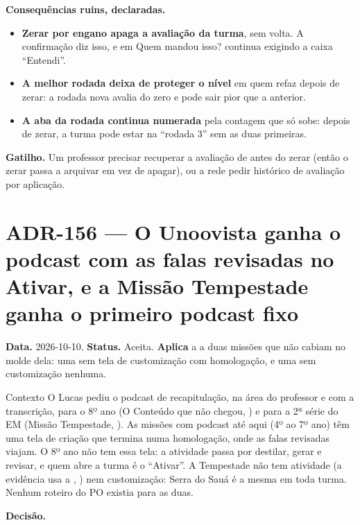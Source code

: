 \textbf{Consequências ruins, declaradas.}

\begin{itemize}
  \item \textbf{Zerar por engano apaga a avaliação da turma}, sem volta. A
    confirmação diz isso, e em Quem mandou isso? continua exigindo a caixa
    \enquote{Entendi}.
  \item \textbf{A melhor rodada deixa de proteger o nível} em quem refaz depois
    de zerar: a rodada nova avalia do zero e pode sair pior que a anterior.
  \item \textbf{A aba da rodada continua numerada} pela contagem que só sobe:
    depois de zerar, a turma pode estar na \enquote{rodada 3} sem as duas
    primeiras.
\end{itemize}

\textbf{Gatilho.} Um professor precisar recuperar a avaliação de antes do
zerar (então o zerar passa a arquivar em vez de apagar), ou a rede pedir
histórico de avaliação por aplicação.

\section{ADR-156 --- O Unoovista ganha o podcast com as falas revisadas no Ativar, e a Missão Tempestade ganha o primeiro podcast fixo}
\label{adr:podcast-unoovista-tempestade}

\textbf{Data.} 2026-10-10. \textbf{Status.} Aceita. \textbf{Aplica} a
 a duas missões que não cabiam no molde dela: uma sem tela de
customização com homologação, e uma sem customização nenhuma.

\begin{especificacao}{Contexto}
O Lucas pediu o podcast de recapitulação, na área do professor e com a
transcrição, para o 8º ano (O Conteúdo que não chegou, ) e para
a 2ª série do EM (Missão Tempestade, ). As missões com podcast
até aqui (4º ao 7º ano) têm uma tela de criação que termina numa homologação,
onde as falas revisadas viajam. O 8º ano não tem essa tela: a atividade passa
por destilar, gerar e revisar, e quem abre a turma é o \enquote{Ativar}. A
Tempestade não tem atividade (a evidência usa a , )
nem customização: Serra do Sauá é a mesma em toda turma. Nenhum roteiro do PO
existia para as duas.
\end{especificacao}

\textbf{Decisão.}

